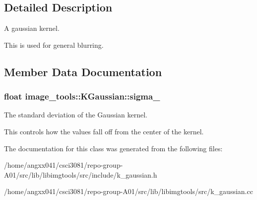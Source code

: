\subsection{Detailed Description}
A gaussian kernel. 

This is used for general blurring. 

\subsection{Member Data Documentation}
\subsubsection[{\texorpdfstring{sigma\+\_\+}{sigma_}}]{\setlength{\rightskip}{0pt plus 5cm}float image\+\_\+tools\+::\+K\+Gaussian\+::sigma\+\_\+\hspace{0.3cm}{\ttfamily [protected]}}\hypertarget{classimage__tools_1_1KGaussian_aae4a308fd2f1065b363660681c863eed}{}\label{classimage__tools_1_1KGaussian_aae4a308fd2f1065b363660681c863eed}


The standard deviation of the Gaussian kernel. 

This controls how the values fall off from the center of the kernel. 

The documentation for this class was generated from the following files\+:\begin{DoxyCompactItemize}
\item 
/home/angxx041/csci3081/repo-\/group-\/\+A01/src/lib/libimgtools/src/include/k\+\_\+gaussian.\+h\item 
/home/angxx041/csci3081/repo-\/group-\/\+A01/src/lib/libimgtools/src/k\+\_\+gaussian.\+cc\end{DoxyCompactItemize}

